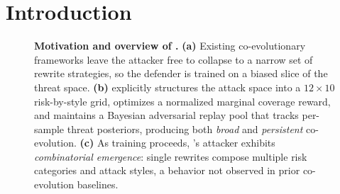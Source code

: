 \section{Introduction}
\label{sec:intro}

\begin{figure}[t]
  \centering
  \fbox{\rule[-3.3cm]{0pt}{6.6cm}\rule[-3.3cm]{0.95\linewidth}{0pt}}
  \caption{\textbf{Motivation and overview of \method.} \textbf{(a)} Existing co-evolutionary frameworks leave the attacker free to collapse to a narrow set of rewrite strategies, so the defender is trained on a biased slice of the threat space. \textbf{(b)} \method explicitly structures the attack space into a $12\times10$ risk-by-style grid, optimizes a normalized marginal coverage reward, and maintains a Bayesian adversarial replay pool that tracks per-sample threat posteriors, producing both \emph{broad} and \emph{persistent} co-evolution. \textbf{(c)} As training proceeds, \method's attacker exhibits \textit{combinatorial emergence}: single rewrites compose multiple risk categories and attack styles, a behavior not observed in prior co-evolution baselines.}
  \label{fig:motivation}
\end{figure}


